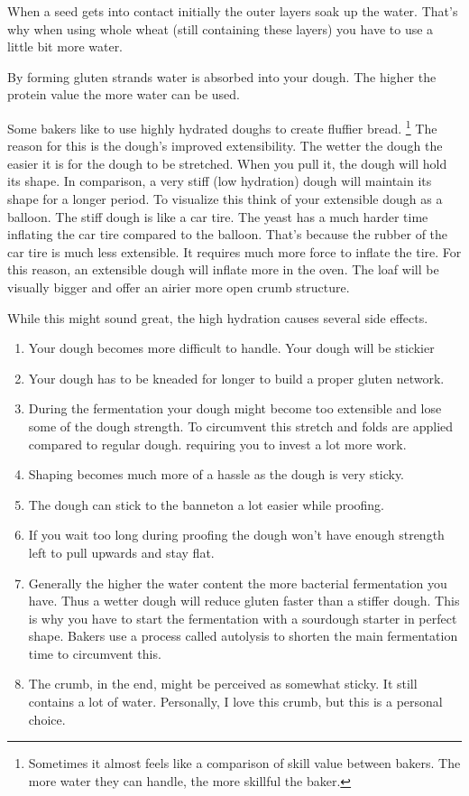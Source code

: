 When a seed gets into contact initially the outer layers soak up the water.
That's why when using whole wheat (still containing these layers) you have to
use a little bit more water.

By forming gluten strands water is absorbed into your dough. The higher the
protein value the more water can be used.

Some bakers like to use highly hydrated doughs to create fluffier bread.
\footnote{Sometimes it almost feels like a comparison of skill value between bakers. The
more water they can handle, the more skillful the baker.} The reason for this
is the dough's improved extensibility. The wetter the dough the easier it is
for the dough to be stretched. When you pull it, the dough will hold its
shape. In comparison, a very stiff (low hydration) dough will maintain its
shape for a longer period. To visualize this think of your extensible
dough as a balloon.  The stiff dough is like a car tire.
The yeast has a much harder time inflating the car tire compared to the balloon.
That’s because the rubber of the car tire is much less extensible.
It requires much more force to inflate the tire. For this reason,
an extensible dough will inflate more in the oven. The loaf will
be visually bigger and offer an airier more open crumb structure.

While this might sound great, the high hydration causes several side effects.

\begin{enumerate}
  \item Your dough becomes more difficult to handle. Your dough will be stickier
  \item Your dough has to be kneaded for longer to build a proper gluten
    network.
  \item During the fermentation your dough might become too extensible and lose
    some of the dough strength. To circumvent this stretch and folds are applied
    compared to regular dough.
    requiring you to invest a lot more work.
  \item Shaping becomes much more of a hassle as the dough is very sticky.
  \item The dough can stick to the banneton a lot easier while proofing.
  \item If you wait too long during proofing the dough won't have enough strength
    left to pull upwards and stay flat.
  \item Generally the higher the water content the more bacterial fermentation you
    have. Thus a wetter dough will reduce gluten faster than a stiffer dough.
    This is why you have to start the fermentation with a sourdough starter in
    perfect shape. Bakers use a process called autolysis to shorten the main
    fermentation time to circumvent this.
  \item The crumb, in the end, might be perceived as somewhat sticky. It still
    contains a lot of water. Personally, I love this crumb, but this is a personal
    choice.
\end{enumerate}

